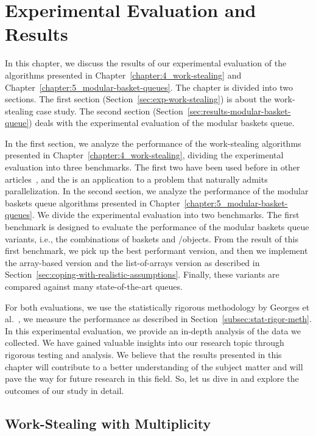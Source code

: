 \chapter{\label{chapter:6_Results}Experimental Evaluation and Results}

In this chapter, we discuss the results of our experimental evaluation of the algorithms presented in Chapter~\ref{chapter:4_work-stealing} and Chapter~\ref{chapter:5_modular-basket-queues}. The chapter is divided into two sections. The first section (Section~\ref{sec:exp-work-stealing}) is about the work-stealing case study. The second section (Section~\ref{sec:results-modular-basket-queue}) deals with the experimental evaluation of the modular baskets queue.

In the first section, we analyze the performance of the work-stealing algorithms presented in Chapter~\ref{chapter:4_work-stealing}, dividing the experimental evaluation into three benchmarks. The first two have been used before in other articles~\cite{DBLP_conf_pldi_FrigoLR98,maged.vechev.2009,fencefreework}, and the is an application to a problem that naturally admits parallelization. In the second section, we analyze the performance of the modular baskets queue algorithms presented in Chapter~\ref{chapter:5_modular-basket-queues}. We divide the experimental evaluation into two benchmarks. The first benchmark is designed to evaluate the performance of the modular baskets queue variants, i.e., the combinations of baskets and \LL/\IC objects. From the result of this first benchmark, we pick up the best performant version, and then we implement the array-based version and the list-of-arrays version as described in Section~\ref{sec:coping-with-realistic-assumptions}. Finally, these variants are compared against many state-of-the-art queues.

For both evaluations, we use the statistically rigorous methodology by Georges et al.~\cite{DBLP_conf_oopsla_GeorgesBE07}, we measure the performance as described in Section~\ref{subsec:stat-rigor-meth}. In this experimental evaluation, we provide an in-depth analysis of the data we collected. We have gained valuable insights into our research topic through rigorous testing and analysis. We believe that the results presented in this chapter will contribute to a better understanding of the subject matter and will pave the way for future research in this field. So, let us dive in and explore the outcomes of our study in detail.

\section{\label{sec:exp-work-stealing}Work-Stealing with Multiplicity}

